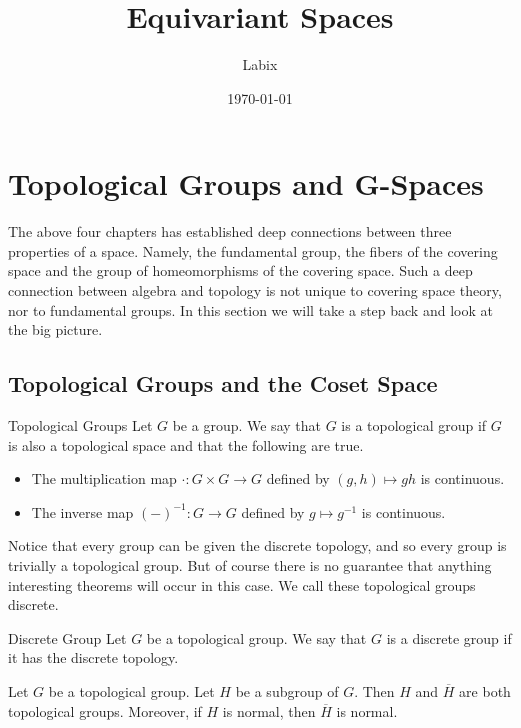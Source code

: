 \documentclass[a4paper]{article}
\title{Equivariant Spaces}
\author{Labix}
\date{\today}
\begin{document}
\maketitle
\begin{abstract}
\end{abstract}

\pagebreak
\tableofcontents
\pagebreak

\pagebreak
\section{Topological Groups and G-Spaces}
The above four chapters has established deep connections between three properties of a space. Namely, the fundamental group, the fibers of the covering space and the group of homeomorphisms of the covering space. Such a deep connection between algebra and topology is not unique to covering space theory, nor to fundamental groups. In this section we will take a step back and look at the big picture. 

\subsection{Topological Groups and the Coset Space}
\begin{defn}{Topological Groups}{} Let $G$ be a group. We say that $G$ is a topological group if $G$ is also a topological space and that the following are true. 
\begin{itemize}
\item The multiplication map $\cdot:G\times G\to G$ defined by $(g,h)\mapsto gh$ is continuous. 
\item The inverse map $(-)^{-1}:G\to G$ defined by $g\mapsto g^{-1}$ is continuous. 
\end{itemize}
\end{defn}

Notice that every group can be given the discrete topology, and so every group is trivially a topological group. But of course there is no guarantee that anything interesting theorems will occur in this case. We call these topological groups discrete. 

\begin{defn}{Discrete Group}{} Let $G$ be a topological group. We say that $G$ is a discrete group if it has the discrete topology. 
\end{defn}

\begin{prp}{}{} Let $G$ be a topological group. Let $H$ be a subgroup of $G$. Then $H$ and $\overline{H}$ are both topological groups. Moreover, if $H$ is normal, then $\overline{H}$ is normal. 
\end{prp}
\end{document}
